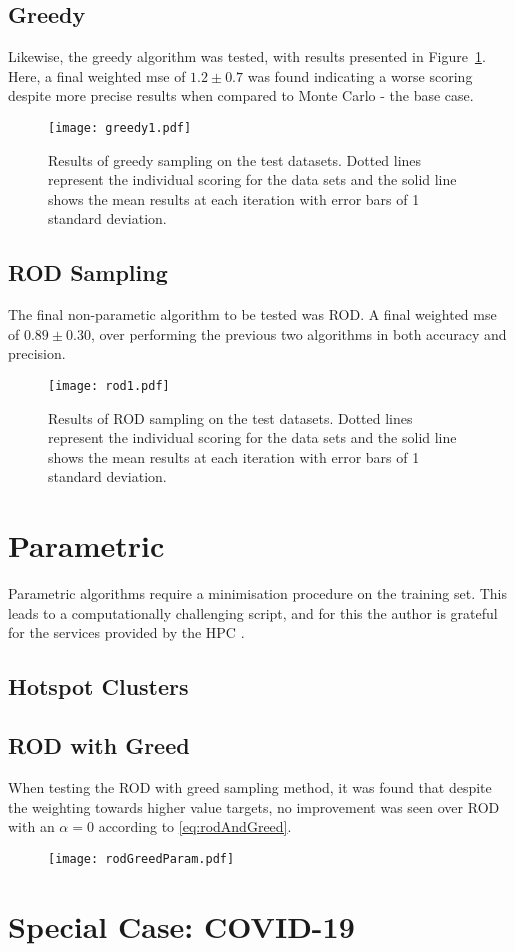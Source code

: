 \subsection{Greedy}
Likewise, the greedy algorithm was tested, with results presented in Figure~\ref{fig:GreedyTestSet}. Here, a final weighted mse of ${1.2\pm{}0.7}$ was found indicating a worse scoring despite more precise results when compared to Monte Carlo - the base case.
\begin{figure}[h]
    \begin{center}
        \texttt{[image: greedy1.pdf]}
        \caption[Greedy]{Results of greedy sampling on the test datasets. Dotted lines represent the individual scoring for the data sets and the solid line shows the mean results at each iteration with error bars of 1 standard deviation.}
        \label{fig:GreedyTestSet}
    \end{center}
\end{figure}

\subsection{ROD Sampling}
The final non-parametic algorithm to be tested was ROD. A final weighted mse of ${0.89\pm{}0.30}$, over performing the previous two algorithms in both accuracy and precision.

\begin{figure}[h]
    \begin{center}
        \texttt{[image: rod1.pdf]}
        \caption[ROD]{Results of ROD sampling on the test datasets. Dotted lines represent the individual scoring for the data sets and the solid line shows the mean results at each iteration with error bars of 1 standard deviation.}
        \label{fig:RODTestSet}
    \end{center}
\end{figure}

\section{Parametric}
Parametric algorithms require a minimisation procedure on the training set. This leads to a computationally challenging script, and for this the author is grateful for the services provided by the HPC \cite{HPC}.
\subsection{Hotspot Clusters}
\blindtext[1]
\subsection{ROD with Greed}
When testing the ROD with greed sampling method, it was found that despite the weighting towards higher value targets, no improvement was seen over ROD with an $\alpha{}=0$ according to \ref{eq:rodAndGreed}.

\begin{figure}[h]
    \begin{center}
        \texttt{[image: rodGreedParam.pdf]}
    \end{center}
\end{figure}

\section{Special Case: COVID-19}